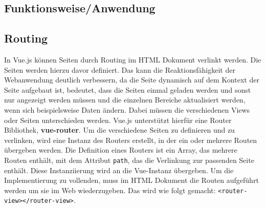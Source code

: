  \subsection{Funktionsweise/Anwendung}
\subsection*{Routing}
In Vue.js k\"onnen Seiten durch Routing im \ac{HTML} Dokument verlinkt werden. Die Seiten werden hierzu davor definiert.
Das kann die Reaktionsf\"ahigkeit der Webanwendung deutlich verbessern, da die Seite dynamisch auf dem Kontext der Seite aufgebaut ist, bedeutet, dass die Seiten einmal geladen werden und sonst nur angezeigt werden m\"ussen und die einzelnen Bereiche aktualisiert werden, wenn sich beispielsweise Daten \"andern. Dabei m\"ussen die verschiedenen Views oder Seiten unterschieden werden. Vue.js unterst\"utzt hierf\"ur eine Router Bibliothek, \textbf{vue-router}\cite{Zynda2017}.
Um die verschiedene Seiten zu definieren und zu verlinken, wird eine Instanz des Routers erstellt, in der ein oder mehrere Routen \"ubergeben werden. Die Definition eines Routers ist ein Array, das mehrere Routen enth\"alt, mit dem Attribut \texttt{path}, das die Verlinkung zur passenden Seite enth\"alt. Diese Instanziierung wird an die Vue-Instanz \"ubergeben.
Um die Implementierung zu vollenden, muss im \ac{HTML} Dokument die Routen aufgef\"uhrt werden um sie im Web wiederzugeben. Das wird wie folgt gemacht:  \texttt{<router-view></router-view>}\cite{Bemenderfer2017}.\\

